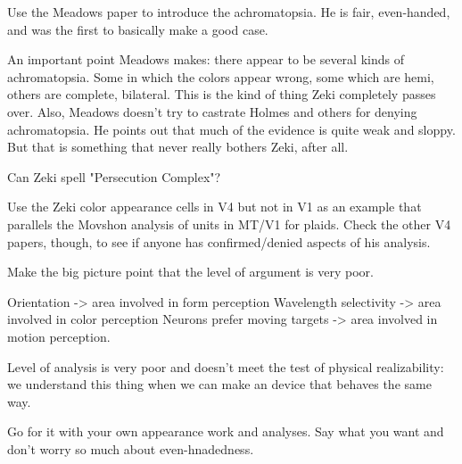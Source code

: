 Use the Meadows paper to
introduce the achromatopsia.  He is fair, even-handed, and 
was the first to basically make a good case.

An important point Meadows makes: there appear to be several
kinds of achromatopsia.  Some in which the colors appear wrong, some
which are hemi, others are complete, bilateral.  This is the kind of
thing Zeki completely passes over.  Also, Meadows doesn't try to
castrate Holmes and others for denying achromatopsia.  He points out
that much of the evidence is quite weak and sloppy.  But that is
something that never really bothers Zeki, after all.

Can Zeki spell "Persecution Complex"?

Use the Zeki color appearance cells in V4 but not in V1 as an
example that parallels the Movshon analysis of units in
MT/V1 for plaids.
Check the other V4 papers, though, to see if anyone has
confirmed/denied aspects of his analysis.

Make the big picture point that the level of argument
is very poor.

Orientation ->  area involved in form perception
Wavelength selectivity -> area involved in color perception
Neurons prefer moving targets -> area involved in motion perception.

Level of analysis is very poor and doesn't meet the test
of physical realizability:  we understand this thing when we can
make an device that behaves the same way.

Go for it with your own appearance work and analyses.
Say what you want and don't worry so much about
even-hnadedness.

